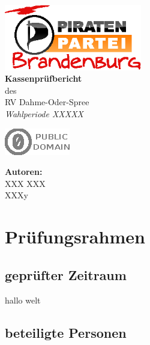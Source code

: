 \documentclass[%
	titlepage,oneside,12pt,headlines=1.5,numbers=noenddot, chapterprefix=false,parskip=full-,DIV=14,pagesize]{scrreprt}
\makeatletter
\newcommand*\@lizenz{
		\includegraphics[scale=2.5]{./pd.eps}
	}
\renewcommand\maketitle{
	\begingroup
		\begin{titlepage}
			\begin{center}
					\includegraphics[width=6cm]{logo}\\[4cm]
				{\bfseries
					\makeatletter
						\Huge Kassenprüfbericht
					\makeatother
				}\\[5mm]
				\makeatletter
					{\Large des}\\[5mm]
					{\Large RV Dahme-Oder-Spree}\\[50mm]
					\textit{\Large Wahlperiode XXXXX}
				\makeatother
					
			\end{center}
    		\vspace*{\fill} 
    		\begin{minipage}[b]{8cm}
    		\begin{flushleft}
    			\makeatletter
    				\@lizenz
    			\makeatother
    		\end{flushleft}
    	\end{minipage}
    		\hfill
    		\begin{minipage}[b]{8cm} 
    			\begin{flushright}
    				\textbf{Autoren:}\\[2mm]
    				XXX XXX\\
    				XXXy
    			\end{flushright}
    		\end{minipage}
    	\end{titlepage}
	\endgroup
	\pagebreak
\onehalfspacing 
}
\makeatother
\begin{document}
 
\maketitle

\tableofcontents
\pagebreak

\chapter{Prüfungsrahmen}
\section{geprüfter Zeitraum}
hallo welt
\section{beteiligte Personen}
\end{document}
